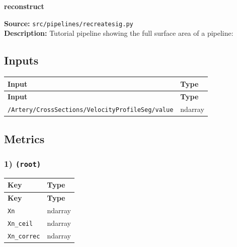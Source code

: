 \documentclass[11pt]{article}
\begin{document}
\begin{center}
\LARGE\textbf{reconstruct}
\end{center}
\textbf{Source:} \texttt{src/\allowbreak{}pipelines/\allowbreak{}recreatesig.py}\\
\textbf{Description:} Tutorial pipeline showing the full surface area of a pipeline:

\subsection*{Inputs}
\begin{longtable}{|p{}|p{}|}
\hline
\textbf{Input} & \textbf{Type} \\ \hline
\endfirsthead
\hline
\textbf{Input} & \textbf{Type} \\ \hline
\endhead
\texttt{/\allowbreak{}Artery/\allowbreak{}CrossSections/\allowbreak{}VelocityProfileSeg/\allowbreak{}value} & ndarray \\ \hline
\end{longtable}

\subsection*{Metrics}
\subsubsection*{1) \texttt{(root)}}
\begin{longtable}{|p{}|p{}|}
\hline
\textbf{Key} & \textbf{Type} \\ \hline
\endfirsthead
\hline
\textbf{Key} & \textbf{Type} \\ \hline
\endhead
\texttt{Xn} & ndarray \\ \hline
\texttt{Xn\_\allowbreak{}ceil} & ndarray \\ \hline
\texttt{Xn\_\allowbreak{}correc} & ndarray \\ \hline
\end{longtable}
\end{document}
